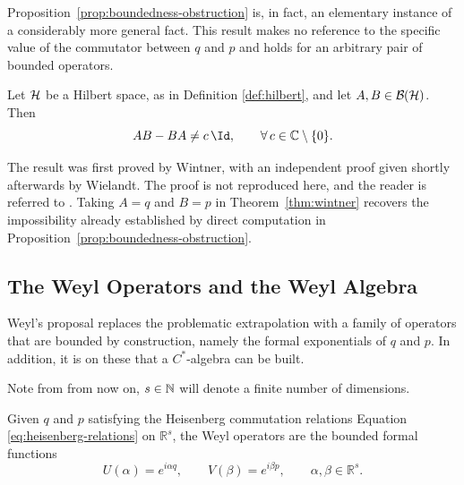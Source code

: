 	\noindent Proposition~\ref{prop:boundedness-obstruction} is, in fact, an elementary instance of a considerably more general fact. This result makes no reference to the specific value of the commutator between $q$ and $p$ and holds for an arbitrary pair of bounded operators. 
	
	\begin{theorem}\label{thm:wintner}
		Let $\H$ be a Hilbert space, as in Definition \ref{def:hilbert}, and let $A,B \in \mathcal{B}(\H)$. Then
		\begin{equation}
			AB - BA \neq c\,\Id, \qquad \forall\, c \in \mathbb{C}\setminus\{0\}.
		\end{equation}
	\end{theorem}
	
	\noindent The result was first proved by Wintner, with an independent proof given shortly afterwards by Wielandt. The proof is not reproduced here, and the reader is referred to \cite[Proposition 11.32]{morettiSpectralTheoryQuantum}. Taking $A=q$ and $B=p$ in Theorem~\ref{thm:wintner} recovers the impossibility already established by direct computation in Proposition~\ref{prop:boundedness-obstruction}.
	
	\subsection*{The Weyl Operators and the Weyl Algebra}
	Weyl's proposal replaces the problematic extrapolation with a family of operators that are bounded by construction, namely the formal exponentials of $q$ and $p$. In addition, it is on these that a $C^*$-algebra can be built.
	
	\begin{remark}
		Note from from now on, $s \in \mathbb{N}$ will denote a finite number of dimensions.
	\end{remark}
	
	\begin{definition}
		\label{def:weyl-operators}
		Given $q$ and $p$ satisfying the Heisenberg commutation relations Equation \eqref{eq:heisenberg-relations} on $\mathbb{R}^s$, the Weyl operators are the bounded formal functions
		\begin{equation}
			U(\alpha) = e^{i\alpha q}, \qquad V(\beta) = e^{i\beta p}, \qquad \alpha,\beta \in \mathbb{R}^s.
			\label{eq:weyl-operators}
		\end{equation}
	\end{definition}
	
